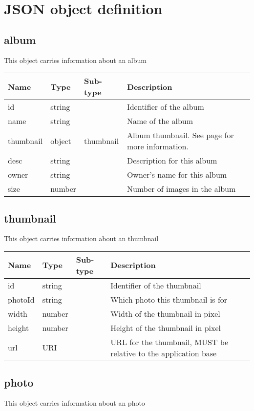 \documentclass[a4paper,12pt]{report}
\newcommand{\see}[1]{See page \pageref{#1} for more information.}
\begin{document}
	
	
	\chapter{JSON object definition}
	\section{album}\label{obj:album}
	This object carries information about an album
	
	\begin{tabular}{|l|l|l|p{10cm}|}
		\hline
		Name & Type & Sub-type & Description\\\hline
		id & string & & Identifier of the album\\\hline
		name & string & & Name of the album\\\hline
		thumbnail & object & thumbnail & Album thumbnail. \see{obj:thumbnail}\\\hline
		desc & string & & Description for this album\\\hline
		owner & string & & Owner's name for this album\\\hline
		size& number & & Number of images in the album\\\hline
	\end{tabular}
	\section{thumbnail}\label{obj:thumbnail}
	This object carries information about an thumbnail
	
	\begin{tabular}{|l|l|l|p{10cm}|}
		\hline
		Name & Type & Sub-type & Description\\\hline
		id & string & & Identifier of the thumbnail\\\hline
		photoId & string & & Which photo this thumbnail is for\\\hline
		width & number & & Width of the thumbnail in pixel\\\hline
		height & number & & Height of the thumbnail in pixel\\\hline
		url & URI & & URL for the thumbnail, MUST be relative to the application base\\\hline
	\end{tabular}
	\section{photo}\label{obj:photo}
	This object carries information about an photo
	
\end{document}
